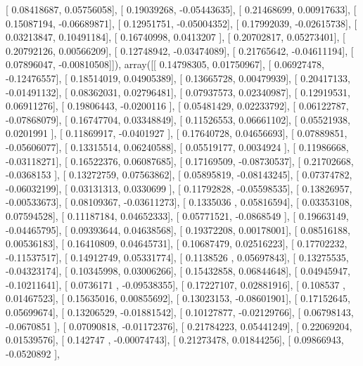 \documentclass{article}
\begin{document}
       [ 0.08418687,  0.05756058],
       [ 0.19039268, -0.05443635],
       [ 0.21468699,  0.00917633],
       [ 0.15087194, -0.06689871],
       [ 0.12951751, -0.05004352],
       [ 0.17992039, -0.02615738],
       [ 0.03213847,  0.10491184],
       [ 0.16740998,  0.0413207 ],
       [ 0.20702817,  0.05273401],
       [ 0.20792126,  0.00566209],
       [ 0.12748942, -0.03474089],
       [ 0.21765642, -0.04611194],
       [ 0.07896047, -0.00810508]]), array([[ 0.14798305,  0.01750967],
       [ 0.06927478, -0.12476557],
       [ 0.18514019,  0.04905389],
       [ 0.13665728,  0.00479939],
       [ 0.20417133, -0.01491132],
       [ 0.08362031,  0.02796481],
       [ 0.07937573,  0.02340987],
       [ 0.12919531,  0.06911276],
       [ 0.19806443, -0.0200116 ],
       [ 0.05481429,  0.02233792],
       [ 0.06122787, -0.07868079],
       [ 0.16747704,  0.03348849],
       [ 0.11526553,  0.06661102],
       [ 0.05521938,  0.0201991 ],
       [ 0.11869917, -0.0401927 ],
       [ 0.17640728,  0.04656693],
       [ 0.07889851, -0.05606077],
       [ 0.13315514,  0.06240588],
       [ 0.05519177,  0.0034924 ],
       [ 0.11986668, -0.03118271],
       [ 0.16522376,  0.06087685],
       [ 0.17169509, -0.08730537],
       [ 0.21702668, -0.0368153 ],
       [ 0.13272759,  0.07563862],
       [ 0.05895819, -0.08143245],
       [ 0.07374782, -0.06032199],
       [ 0.03131313,  0.0330699 ],
       [ 0.11792828, -0.05598535],
       [ 0.13826957, -0.00533673],
       [ 0.08109367, -0.03611273],
       [ 0.1335036 ,  0.05816594],
       [ 0.03353108,  0.07594528],
       [ 0.11187184,  0.04652333],
       [ 0.05771521, -0.0868549 ],
       [ 0.19663149, -0.04465795],
       [ 0.09393644,  0.04638568],
       [ 0.19372208,  0.00178001],
       [ 0.08516188,  0.00536183],
       [ 0.16410809,  0.04645731],
       [ 0.10687479,  0.02516223],
       [ 0.17702232, -0.11537517],
       [ 0.14912749,  0.05331774],
       [ 0.1138526 ,  0.05697843],
       [ 0.13275535, -0.04323174],
       [ 0.10345998,  0.03006266],
       [ 0.15432858,  0.06844648],
       [ 0.04945947, -0.10211641],
       [ 0.0736171 , -0.09538355],
       [ 0.17227107,  0.02881916],
       [ 0.108537  ,  0.01467523],
       [ 0.15635016,  0.00855692],
       [ 0.13023153, -0.08601901],
       [ 0.17152645,  0.05699674],
       [ 0.13206529, -0.01881542],
       [ 0.10127877, -0.02129766],
       [ 0.06798143, -0.0670851 ],
       [ 0.07090818, -0.01172376],
       [ 0.21784223,  0.05441249],
       [ 0.22069204,  0.01539576],
       [ 0.142747  , -0.00074743],
       [ 0.21273478,  0.01844256],
       [ 0.09866943, -0.0520892 ],
\end{document}
